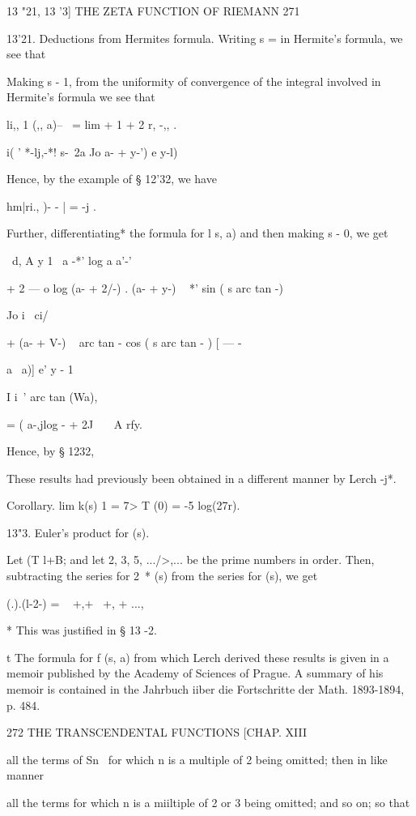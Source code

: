13 "21, 13 '3] THE ZETA FUNCTION OF RIEMANN 271

13'21. Deductions from Hermites formula. Writing s = in Hermite's
formula, we see that

Making s - 1, from the uniformity of convergence of the integral
involved in Hermite's formula we see that

li,, 1 (,, a)-- \ = lim + 1 + 2 r, -,, .

  i( ' *-lj,-*! s-\ 2a Jo a- + y-') e y-l)

Hence, by the example of § 12'32, we have

hm|ri., )- - | = -j .

Further, differentiating* the formula for l s, a) and then making s -
0, we get

\ d, A y 1 \, a -*' log a a'-'

+ 2 — o log (a- + 2/-) . (a- + y-) ~ *' sin ( s arc tan -)

Jo i \ ci/

+ (a- + V-) ~ arc tan - cos ( s arc tan - ) [ — -

    a \ a)] e' y - 1

I i\, ' arc tan (Wa),

= ( a-,jlog - + 2J \ \ \ A rfy.

Hence, by § 1232,

These results had previously been obtained in a different manner by
Lerch -j*.

Corollary. lim k(s) 1 = 7> T (0) = -5 log(27r).

13"3. Euler's product for (s).

Let (T l+B; and let 2, 3, 5, .../>,... be the prime numbers in order.
Then, subtracting the series for 2~* (s) from the series for (s), we
get

 (.).(l-2-) = ~ +,+~ +, + ...,

* This was justified in § 13 -2.

t The formula for f (s, a) from which Lerch derived these results is
given in a memoir published by the Academy of Sciences of Prague. A
summary of his memoir is contained in the Jahrbuch iiber die
Fortschritte der Math. 1893-1894, p. 484.

272 THE TRANSCENDENTAL FUNCTIONS [CHAP. XIII

all the terms of Sn~ for which n is a multiple of 2 being omitted;
then in like manner

all the terms for which n is a miiltiple of 2 or 3 being omitted; and
so on; so that

